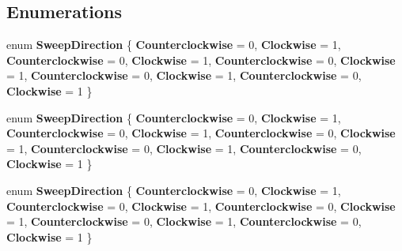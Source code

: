 \subsection*{Enumerations}
\begin{DoxyCompactItemize}
\item 
\mbox{\label{namespace_windows_1_1_u_i_1_1_xaml_1_1_media_a38a86a3bb843209bfd6ac407e1f0ca75}} 
enum {\bfseries Sweep\+Direction} \{ \newline
{\bfseries Counterclockwise} = 0, 
{\bfseries Clockwise} = 1, 
{\bfseries Counterclockwise} = 0, 
{\bfseries Clockwise} = 1, 
\newline
{\bfseries Counterclockwise} = 0, 
{\bfseries Clockwise} = 1, 
{\bfseries Counterclockwise} = 0, 
{\bfseries Clockwise} = 1, 
\newline
{\bfseries Counterclockwise} = 0, 
{\bfseries Clockwise} = 1
 \}
\item 
\mbox{\label{namespace_windows_1_1_u_i_1_1_xaml_1_1_media_a38a86a3bb843209bfd6ac407e1f0ca75}} 
enum {\bfseries Sweep\+Direction} \{ \newline
{\bfseries Counterclockwise} = 0, 
{\bfseries Clockwise} = 1, 
{\bfseries Counterclockwise} = 0, 
{\bfseries Clockwise} = 1, 
\newline
{\bfseries Counterclockwise} = 0, 
{\bfseries Clockwise} = 1, 
{\bfseries Counterclockwise} = 0, 
{\bfseries Clockwise} = 1, 
\newline
{\bfseries Counterclockwise} = 0, 
{\bfseries Clockwise} = 1
 \}
\item 
\mbox{\label{namespace_windows_1_1_u_i_1_1_xaml_1_1_media_a38a86a3bb843209bfd6ac407e1f0ca75}} 
enum {\bfseries Sweep\+Direction} \{ \newline
{\bfseries Counterclockwise} = 0, 
{\bfseries Clockwise} = 1, 
{\bfseries Counterclockwise} = 0, 
{\bfseries Clockwise} = 1, 
\newline
{\bfseries Counterclockwise} = 0, 
{\bfseries Clockwise} = 1, 
{\bfseries Counterclockwise} = 0, 
{\bfseries Clockwise} = 1, 
\newline
{\bfseries Counterclockwise} = 0, 
{\bfseries Clockwise} = 1
 \}
\item 
\mbox{\label{namespace_windows_1_1_u_i_1_1_xaml_1_1_media_a38a86a3bb843209bfd6ac407e1f0ca75}} 

\end{DoxyCompactItemize}
